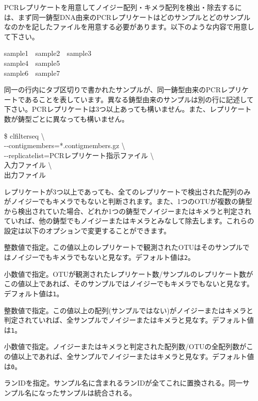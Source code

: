 \documentclass[titlepage,10pt,a4paper,english]{jsbook}
\newenvironment{pre}{\begin{leftbar}\raggedright\ttfamily\footnotesize\setlength{\baselineskip}{1.4em}}{\end{leftbar}\vspace{-1em}}
\newenvironment{cmd}{\begin{oframed}\raggedright\ttfamily\footnotesize\setlength{\baselineskip}{1.4em}}{\end{oframed}\vspace{-1em}}
\begin{document}
PCRレプリケートを用意してノイジー配列・キメラ配列を検出・除去するには、まず同一鋳型DNA由来のPCRレプリケートはどのサンプルとどのサンプルなのかを記したファイルを用意する必要があります。以下のような内容で用意して下さい。
\begin{pre}
sample1~~sample2~~sample3\\
sample4~~sample5\\
sample6~~sample7
\end{pre}
同一の行内にタブ区切りで書かれたサンプルが、同一鋳型由来のPCRレプリケートであることを表しています。異なる鋳型由来のサンプルは別の行に記述して下さい。PCRレプリケートは3つ以上あっても構いません。また、レプリケート数が鋳型ごとに異なっても構いません。
\begin{cmd}
\$ clfilterseq {\textbackslash}\\
{-}{-}contigmembers=*.contigmembers.gz {\textbackslash}\\
{-}{-}replicatelist=PCRレプリケート指示ファイル {\textbackslash}\\
入力ファイル {\textbackslash}\\
出力ファイル
\end{cmd}
レプリケートが3つ以上であっても、全てのレプリケートで検出された配列のみがノイジーでもキメラでもないと判断されます。また、1つのOTUが複数の鋳型から検出されていた場合、どれか1つの鋳型でノイジーまたはキメラと判定されていれば、他の鋳型でもノイジーまたはキメラとみなして除去します。これらの設定は以下のオプションで変更することができます。
\begin{description}\small\setlength{\baselineskip}{1.1em}
\item[\texttt{{-}{-}minnreplicate}] 整数値で指定。この値以上のレプリケートで観測されたOTUはそのサンプルではノイジーでもキメラでもないと見なす。デフォルト値は\texttt{2}。
\item[\texttt{{-}{-}minpreplicate}] 小数値で指定。OTUが観測されたレプリケート数/サンプルのレプリケート数がこの値以上であれば、そのサンプルではノイジーでもキメラでもないと見なす。デフォルト値は\texttt{1}。
\item[\texttt{{-}{-}minnpositive}] 整数値で指定。この値以上の配列(サンプルではない)がノイジーまたはキメラと判定されていれば、全サンプルでノイジーまたはキメラと見なす。デフォルト値は\texttt{1}。
\item[\texttt{{-}{-}minppositive}] 小数値で指定。ノイジーまたはキメラと判定された配列数/OTUの全配列数がこの値以上であれば、全サンプルでノイジーまたはキメラと見なす。デフォルト値は\texttt{0}。
\item[\texttt{{-}{-}runname}] ランIDを指定。サンプル名に含まれるランIDが全てこれに置換される。同一サンプル名になったサンプルは統合される。
\end{description}
\end{document}
